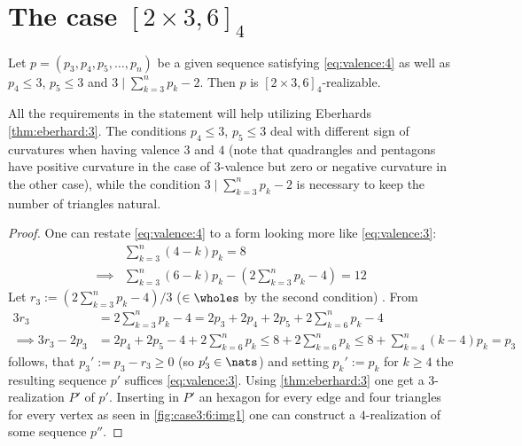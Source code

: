 \section{The case $[2 \times 3, 6]_4$}
\begin{lemma}
  Let $p = (p_3, p_4, p_5, \dots, p_n)$ be a given sequence satisfying \autoref{eq:valence:4} as well as $p_4 \leq 3$, $p_5 \leq 3$ and $3 \mid \sum_{k=3}^{n} p_k - 2$. Then $p$ is $[2 \times 3, 6]_4$-realizable.

  All the requirements in the statement will help utilizing Eberhards \autoref{thm:eberhard:3}. The conditions $p_4 \leq 3$, $p_5 \leq 3$ deal with different sign of curvatures when having valence $3$ and $4$ (note that quadrangles and pentagons have positive curvature in the case of $3$-valence but zero or negative curvature in the other case), while the condition $3 \mid \sum_{k=3}^{n} p_k - 2$ is necessary to keep the number of triangles natural. 
  \begin{proof}
    One can restate \autoref{eq:valence:4} to a form looking more like \autoref{eq:valence:3}:
    \begin{align*}
      & \sum_{k=3}^n \left( 4 - k \right) p_k = 8 \\
      \implies & \sum_{k=3}^n \left( 6 - k \right) p_k - \left(2 \sum_{k=3}^n  p_k - 4 \right) = 12
    \end{align*}
    Let $r_3 := (2 \sum_{k=3}^{n} p_k - 4)/3$ ($\in \wholes$ by the second condition) . From
    \begin{align*}
      3 r_3 &= 2 \sum_{k=3}^{n} p_k - 4 =  2 p_3 + 2 p_4 + 2 p_5 + 2 \sum_{k=6}^{n} p_k - 4\\
      \implies 3 r_3 - 2 p_3 &= 2 p_4 + 2 p_5 - 4 + 2 \sum_{k=6}^{n} p_k \leq 8 + 2 \sum_{k=6}^{n} p_k \leq 8 + \sum_{k=4}^{n} (k - 4) p_k = p_3
    \end{align*}
    follows, that $p_3' := p_3 - r_3 \geq 0$ (so $p'_3 \in \nats$) and setting $p_k' := p_k$ for $k \geq 4$ the resulting sequence $p'$ suffices \autoref{eq:valence:3}. Using \autoref{thm:eberhard:3} one get a $3$-realization $P'$ of $p'$. Inserting in $P'$ an hexagon for every edge and four triangles for every vertex as seen in \autoref{fig:case3:6:img1} one can construct a $4$-realization of some sequence $p''$.
    

\end{proof}
\end{lemma}
